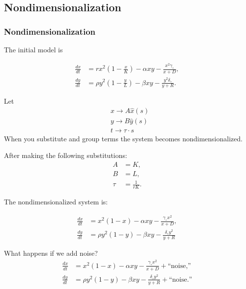 
\subsection{Nondimensionalization}

\begin{frame}
\frametitle{Nondimensionalization}

The initial model is

  \begin{align*}
    \frac{dx}{dt} & = rx^2 \left(1-\frac{x}{K}\right) - \alpha xy - \frac{x^2 \gamma_\circ}{x+D}, \\
    \frac{dy}{dt} & = \rho y^2 \left(1-\frac{y}{L}\right) - \beta xy -\frac{y^2 \delta_\circ}{y+R}.
  \end{align*}
	
Let 
\begin{align*}
		& x \rightarrow A \hat{x} (s) \\
		& y \rightarrow B \hat{y} (s) \\
		& t \rightarrow \tau \cdot s
\end{align*}
When you substitute and group terms the system becomes nondimensionalized. 
\end{frame}

\begin{frame}
After making the following substitutions: \\
\begin{align*}
		A &= K, \\
		B &= L, \\
		\tau &= \frac{1}{rK}.	
\end{align*}

The nondimensionalized system is:

	\begin{align*}
		\frac{dx}{dt} &= x^2 (1-x) - \alpha xy - \frac{\gamma_\circ x^2}{x+D}, \\
    \frac{dy}{dt} &= \rho y^2 (1-y) - \beta xy -\frac{\delta_\circ y^2}{y+R}
	\end{align*}
\end{frame}

\begin{frame}
		What happens if we add noise?
	\begin{align*}
		\frac{dx}{dt} &= x^2 (1-x) - \alpha xy - \frac{\gamma_\circ x^2}{x+D} + \text{``noise,''} \\
    \frac{dy}{dt} &= \rho y^2 (1-y) - \beta xy -\frac{\delta_\circ y^2}{y+R}+ \text{``noise.''}
	\end{align*}
\end{frame}

